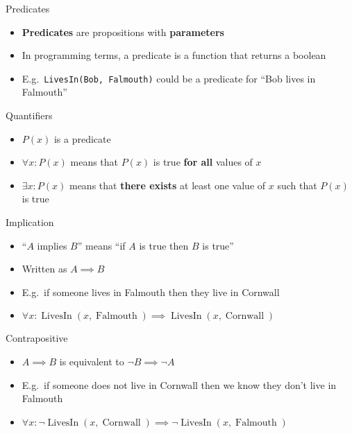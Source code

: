 \begin{frame}{Predicates}
	\begin{itemize}
		\pause\item \textbf{Predicates} are propositions with \textbf{parameters}
		\pause\item In programming terms, a predicate is a function that returns a boolean
		\pause\item E.g.\ \lstinline{LivesIn(Bob, Falmouth)} could be a predicate for ``Bob lives in Falmouth''
	\end{itemize}
\end{frame}

\begin{frame}{Quantifiers}
	\begin{itemize}
		\pause\item $P(x)$ is a predicate
		\pause\item $\forall x : P(x)$ means that $P(x)$ is true \textbf{for all} values of $x$
		\pause\item $\exists x : P(x)$ means that \textbf{there exists} at least one value of $x$ such that $P(x)$ is true
	\end{itemize}
\end{frame}

\newcommand{\LivesIn}{\operatorname{LivesIn}}
\newcommand{\Falmouth}{\operatorname{Falmouth}}
\newcommand{\Cornwall}{\operatorname{Cornwall}}
\newcommand{\England}{\operatorname{England}}
\newcommand{\InCornwall}{\operatorname{InCornwall}}
\newcommand{\IsCity}{\operatorname{IsCity}}
\newcommand{\Truro}{\operatorname{Truro}}
\newcommand{\Cider}{\operatorname{Cider}}
\newcommand{\Likes}{\operatorname{Likes}}

\begin{frame}{Implication}
	\begin{itemize}
		\pause\item ``$A$ implies $B$'' means ``if $A$ is true then $B$ is true''
		\pause\item Written as $A \implies B$
		\pause\item E.g.\ if someone lives in Falmouth then they live in Cornwall
		\pause\item $\forall x : \LivesIn(x, \Falmouth) \implies \LivesIn(x, \Cornwall)$
	\end{itemize}
\end{frame}

\begin{frame}{Contrapositive}
	\begin{itemize}
		\pause\item $A \implies B$ is equivalent to $\neg B \implies \neg A$
		\pause\item E.g.\ if someone does not live in Cornwall then we know they don't live in Falmouth
		\pause\item $\forall x : \neg \LivesIn(x, \Cornwall) \implies \neg \LivesIn(x, \Falmouth)$
	\end{itemize}
\end{frame}

